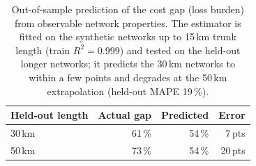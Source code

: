 \begin{table}[t]
\centering
\caption{Out-of-sample prediction of the cost gap (loss burden) from observable network
properties. The estimator is fitted on the synthetic networks up to 15\,km trunk length
(train $R^2=0.999$) and tested on the held-out longer networks; it predicts the 30\,km
networks to within a few points and degrades at the 50\,km extrapolation (held-out MAPE
19\,\%).}
\label{tab:prediction}
\begin{tabular}{lrrr}
\hline
Held-out length & Actual gap & Predicted & Error \\
\hline
30\,km & 61\,\% & 54\,\% & 7\,pts \\
50\,km & 73\,\% & 54\,\% & 20\,pts \\
\hline
\end{tabular}
\end{table}
